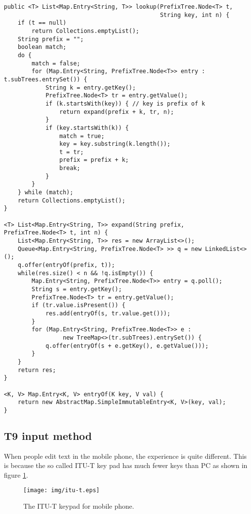 \documentclass{article}
\begin{document}
\lstset{language=Java}
\begin{lstlisting}
public <T> List<Map.Entry<String, T>> lookup(PrefixTree.Node<T> t,
                                             String key, int n) {
    if (t == null)
        return Collections.emptyList();
    String prefix = "";
    boolean match;
    do {
        match = false;
        for (Map.Entry<String, PrefixTree.Node<T>> entry : t.subTrees.entrySet()) {
            String k = entry.getKey();
            PrefixTree.Node<T> tr = entry.getValue();
            if (k.startsWith(key)) { // key is prefix of k
                return expand(prefix + k, tr, n);
            }
            if (key.startsWith(k)) {
                match = true;
                key = key.substring(k.length());
                t = tr;
                prefix = prefix + k;
                break;
            }
        }
    } while (match);
    return Collections.emptyList();
}

<T> List<Map.Entry<String, T>> expand(String prefix, PrefixTree.Node<T> t, int n) {
    List<Map.Entry<String, T>> res = new ArrayList<>();
    Queue<Map.Entry<String, PrefixTree.Node<T> >> q = new LinkedList<>();
    q.offer(entryOf(prefix, t));
    while(res.size() < n && !q.isEmpty()) {
        Map.Entry<String, PrefixTree.Node<T>> entry = q.poll();
        String s = entry.getKey();
        PrefixTree.Node<T> tr = entry.getValue();
        if (tr.value.isPresent()) {
            res.add(entryOf(s, tr.value.get()));
        }
        for (Map.Entry<String, PrefixTree.Node<T>> e :
                 new TreeMap<>(tr.subTrees).entrySet()) {
            q.offer(entryOf(s + e.getKey(), e.getValue()));
        }
    }
    return res;
}

<K, V> Map.Entry<K, V> entryOf(K key, V val) {
    return new AbstractMap.SimpleImmutableEntry<K, V>(key, val);
}
\end{lstlisting}


\subsection{T9 input method}

When people edit text in the mobile phone, the experience is quite different.
This is because the so called ITU-T key pad has much fewer
keys than PC as shown in figure \ref{fig:itut-keypad}.

\begin{figure}[htbp]
  \centering
  \texttt{[image: img/itu-t.eps]}
  \caption{The ITU-T keypad for mobile phone.}
  \label{fig:itut-keypad}
\end{figure}
\end{document}

